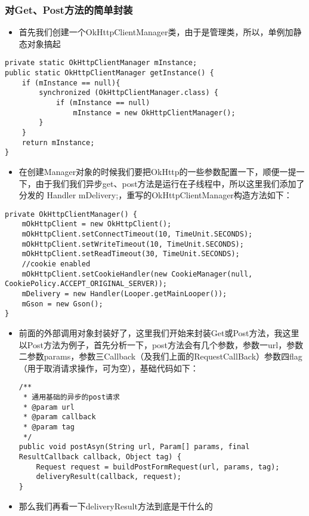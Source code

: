 \documentclass[9pt, b5paper]{article}
\begin{document}
\subsubsection{对Get、Post方法的简单封装　}
\label{sec-3-3-2}
\begin{itemize}
\item 首先我们创建一个OkHttpClientManager类，由于是管理类，所以，单例加静态对象搞起
\end{itemize}
\begin{verbatim}
private static OkHttpClientManager mInstance;
public static OkHttpClientManager getInstance() {
    if (mInstance == null){
        synchronized (OkHttpClientManager.class) {
            if (mInstance == null) 
                mInstance = new OkHttpClientManager();
        }
    }
    return mInstance;
}
\end{verbatim}
\begin{itemize}
\item 在创建Manager对象的时候我们要把OkHttp的一些参数配置一下，顺便一提一下，由于我们我们异步get、post方法是运行在子线程中，所以这里我们添加了分发的 Handler mDelivery;，重写的OkHttpClientManager构造方法如下：
\end{itemize}
\begin{verbatim}
private OkHttpClientManager() {
    mOkHttpClient = new OkHttpClient();
    mOkHttpClient.setConnectTimeout(10, TimeUnit.SECONDS);
    mOkHttpClient.setWriteTimeout(10, TimeUnit.SECONDS);
    mOkHttpClient.setReadTimeout(30, TimeUnit.SECONDS);
    //cookie enabled
    mOkHttpClient.setCookieHandler(new CookieManager(null, CookiePolicy.ACCEPT_ORIGINAL_SERVER));
    mDelivery = new Handler(Looper.getMainLooper());
    mGson = new Gson();
}
\end{verbatim}
\begin{itemize}
\item 前面的外部调用对象封装好了，这里我们开始来封装Get或Post方法，我这里以Post方法为例子，首先分析一下，post方法会有几个参数，参数一url，参数二参数params，参数三Callback（及我们上面的RequestCallBack）参数四flag（用于取消请求操作，可为空），基础代码如下：
\begin{verbatim}
/**
 * 通用基础的异步的post请求
 * @param url
 * @param callback
 * @param tag
 */
public void postAsyn(String url, Param[] params, final ResultCallback callback, Object tag) {
    Request request = buildPostFormRequest(url, params, tag);
    deliveryResult(callback, request);
}
\end{verbatim}
\item 那么我们再看一下deliveryResult方法到底是干什么的
\end{itemize}
\end{document}
